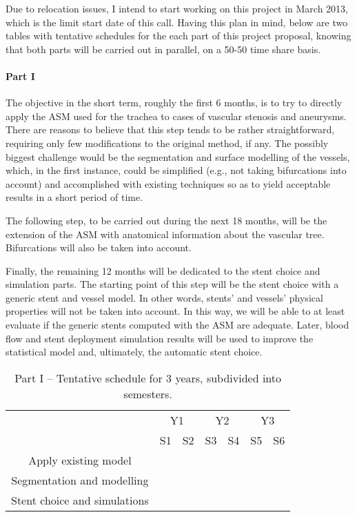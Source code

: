 Due to relocation issues, I intend to start working on this project in March 2013, which is the limit start date of this call. Having this plan in mind, below are two tables with tentative schedules for the each part of this project proposal, knowing that both parts will be carried out in parallel, on a 50-50 time share basis.

\paragraph{Part I}
The objective in the short term, roughly the first 6 months, is to try to directly apply the ASM used for the trachea to cases of vascular stenosis and aneurysms. There are reasons to believe that this step tends to be rather straightforward, requiring only few modifications to the original method, if any. The possibly biggest challenge would be the segmentation and surface modelling of the vessels, which, in the first instance, could be simplified (e.g., not taking bifurcations into account) and accomplished with existing techniques so as to yield acceptable results in a short period of time. 

The following step, to be carried out during the next 18 months, will be the extension of the ASM with anatomical information about the vascular tree. Bifurcations will also be taken into account. 

Finally, the remaining 12 months will be dedicated to the stent choice and simulation parts. The starting point of this step will be the stent choice with a generic stent and vessel model. In other words, stents' and vessels' physical properties will not be taken into account. In this way, we will be able to at least evaluate if the generic stents computed with the ASM are adequate. Later, blood flow and stent deployment simulation results will be used to improve the statistical model and, ultimately, the automatic stent choice.  

\begin{table}[h]\centering
\begin{tabular}{c|c|c|c|c|c|c|}
\cline{2-7}
 & \multicolumn{2}{|c|}{Y1} & \multicolumn{2}{|c|}{Y2} & \multicolumn{2}{|c|}{Y3} \\ \cline{2-7}
 & S1 & S2 & S3 & S4 & S5 & S6 \\ \hline
\multicolumn{1}{|c|}{Apply existing model} & \cellcolor{green} & & & & & \\ \hline
\multicolumn{1}{|c|}{Segmentation and modelling} & & \cellcolor{green} & \cellcolor{green} & \cellcolor{green} & & \\ \hline
\multicolumn{1}{|c|}{Stent choice and simulations} & & & & & \cellcolor{green} & \cellcolor{green} \\ \hline
\end{tabular}
\caption{Part I -- Tentative schedule for 3 years, subdivided into semesters.}
\label{tab:schedule1}
\end{table}

